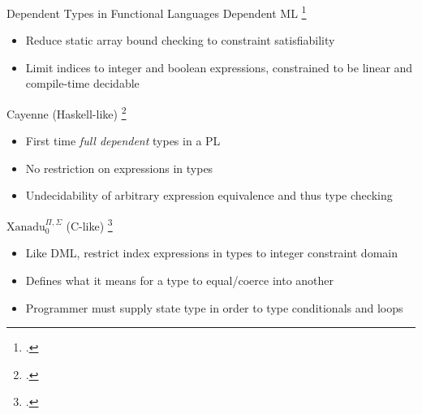 \documentclass[aspectratio=169]{beamer}
\begin{document}
\begin{frame}{Dependent Types in Functional Languages}
Dependent ML \footcite{xi_eliminating_1998}
\begin{itemize}
    \item Reduce static array bound checking to constraint satisfiability
    \item Limit indices to integer and boolean expressions, constrained to be linear and compile-time decidable
\end{itemize}
Cayenne (Haskell-like) \footcite{augustsson_cayennelanguage_1998}
\begin{itemize}
    \item First time \emph{full dependent} types in a PL
    \item No restriction on expressions in types
    \item Undecidability of arbitrary expression equivalence and thus type checking
\end{itemize}
$\text{Xanadu}_{0}^{\Pi,\Sigma}$ (C-like) \footcite{xi_imperative_2000}
\begin{itemize}
    \item Like DML, restrict index expressions in types to integer constraint domain
    \item Defines what it means for a type to equal/coerce into another
    \item Programmer must supply state type in order to type conditionals and loops
\end{itemize}
\end{frame}

\end{document}
